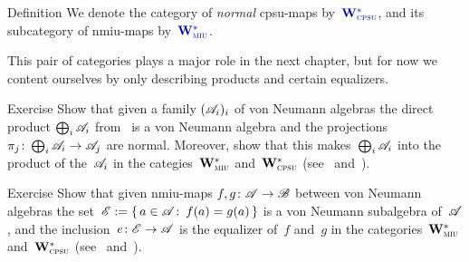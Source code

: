 \documentclass[a]{subfiles}
\begin{document}
\begin{parsec}%
\begin{point}{Definition}%
We denote 
the category of
\emph{normal} cpsu-maps
by~$\Define{\W{cpsu}}$,
and its subcategory of nmiu-maps
by~$\Define{\W{miu}}$.
\begin{point}%
This pair of categories plays a major role in the next
chapter, but for now we content ourselves
by only describing products and certain equalizers.
\end{point}
\end{point}
\begin{point}[vn-products]{Exercise}%
Show that
given a family $(\mathscr{A}_i)_i$
of von Neumann algebras
the direct product
$\bigoplus_i \mathscr{A}_i$
from~
is a von Neumann algebra
and  the projections
$\pi_j \colon \bigoplus_i \mathscr{A}_i\to\mathscr{A}_j$
are normal.
Moreover, show
that this makes~$\bigoplus_i \mathscr{A}_i$
into the  product of the~$\mathscr{A}_i$
in the categies~$\mathbf{W}^*_{\text{\textsc{miu}}}$ and~$\mathbf{W}^*_{\text{\textsc{cpsu}}}$
(see~ and~).
\end{point}
\begin{point}[vn-equalizers]{Exercise}%
Show that given nmiu-maps $f,g\colon \mathscr{A}\to\mathscr{B}$
between von Neumann algebras
the set~$\mathscr{E}:=\{\,a\in\mathscr{A}\colon\, f(a)=g(a)\,\}$
is a von Neumann subalgebra of~$\mathscr{A}$,
and the inclusion~$e\colon \mathscr{E}\to\mathscr{A}$
is the equalizer of~$f$ and~$g$ in the 
categories~$\mathbf{W}^*_{\text{\textsc{miu}}}$ and~$\mathbf{W}^*_{\text{\textsc{cpsu}}}$
(see~ and~).
\end{point}
\end{parsec}
\end{document}

